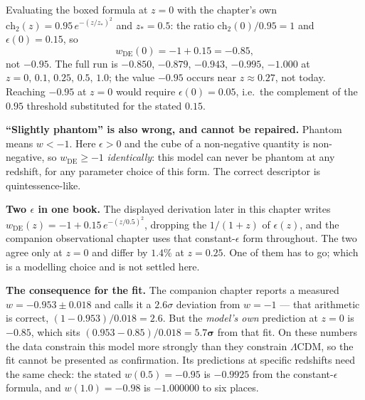 \begin{remark}
\label{rem:wDE-today-2026-10-03}
Evaluating the boxed formula at $z = 0$ with the chapter's own
$\text{ch}_2(z) = 0.95\,e^{-(z/z_*)^2}$ and $z_* = 0.5$: the ratio
$\text{ch}_2(0)/0.95 = 1$ and $\epsilon(0) = 0.15$, so
\[
w_{\text{DE}}(0) = -1 + 0.15 = \mathbf{-0.85},
\]
not $-0.95$. The full run is $-0.850$, $-0.879$, $-0.943$, $-0.995$, $-1.000$ at
$z = 0,\,0.1,\,0.25,\,0.5,\,1.0$; the value $-0.95$ occurs near $z \approx 0.27$,
not today. Reaching $-0.95$ at $z = 0$ would require $\epsilon(0) = 0.05$, i.e.\
the complement of the $0.95$ threshold substituted for the stated $0.15$.

\textbf{``Slightly phantom'' is also wrong, and cannot be repaired.} Phantom means
$w < -1$. Here $\epsilon > 0$ and the cube of a non-negative quantity is
non-negative, so $w_{\text{DE}} \geq -1$ \emph{identically}: this model can never
be phantom at any redshift, for any parameter choice of this form. The correct
descriptor is quintessence-like.

\textbf{Two $\epsilon$ in one book.} The displayed derivation later in this
chapter writes $w_{\text{DE}}(z) = -1 + 0.15\,e^{-(z/0.5)^2}$, dropping the
$1/(1+z)$ of $\epsilon(z)$, and the companion observational chapter uses that
constant-$\epsilon$ form throughout. The two agree only at $z = 0$ and differ by
$1.4\%$ at $z = 0.25$. One of them has to go; which is a modelling choice and is
not settled here.

\textbf{The consequence for the fit.} The companion chapter reports a measured
$w = -0.953 \pm 0.018$ and calls it a $2.6\sigma$ deviation from $w = -1$ --- that
arithmetic is correct, $(1-0.953)/0.018 = 2.6$. But the \emph{model's own}
prediction at $z = 0$ is $-0.85$, which sits
$(0.953 - 0.85)/0.018 = \mathbf{5.7\sigma}$ from that fit. On these numbers the
data constrain this model more strongly than they constrain $\Lambda$CDM, so the
fit cannot be presented as confirmation. Its predictions at specific redshifts
need the same check: the stated $w(0.5) = -0.95$ is $-0.9925$ from the
constant-$\epsilon$ formula, and $w(1.0) = -0.98$ is $-1.000000$ to six places.
\end{remark}

